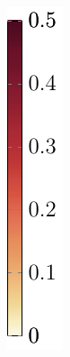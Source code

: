 \documentclass[aspectratio=169,xcolor=dvipsnames,11pt]{beamer}
\begin{document}
\begin{frame}
\begin{figure}
\begin{minipage}[c]{0.475\textwidth}
\begin{minipage}[c]{0.075\textwidth}
			\includegraphics[width=\linewidth]{Figures/tikz/FEniCS_plots/example4/colorbar/colorbar5.pdf}

\end{minipage}
\end{minipage}
\end{figure}
\end{frame}
\end{document}
